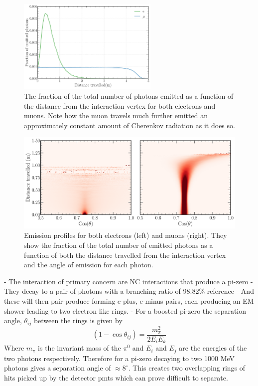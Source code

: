 \begin{figure} %
    \includegraphics[width=0.6\textwidth]{diagrams/4-chips/emission_distance.pdf}
    \caption[Fraction of Cherenkov photons emitted as a function of distance.]
    {The fraction of the total number of photons emitted as a function of the distance from the
        interaction vertex for both electrons and muons. Note how the muon travels much further
        emitted an approximately constant amount of Cherenkov radiation as it does so.}
    \label{fig:emission distance}
\end{figure}

\begin{figure} %
    \includegraphics[width=\textwidth]{diagrams/4-chips/emission_profile.pdf}
    \caption[Emission profiles for both electrons and muons]
    {Emission profiles for both electrons (left) and muons (right). They show the fraction of the
        total number of emitted photons as a function of both the distance travelled from the
        interaction vertex and the angle of emission for each photon.}
    \label{fig:emission_profile}
\end{figure}

- The interaction of primary concern are NC interactions that produce a pi-zero
- They decay to a pair of photons with a branching ratio of 98.82\% reference
- And these will then pair-produce forming e-plus, e-minus pairs, each producing an EM shower
leading to two electron like rings.
- For a boosted pi-zero the separation angle, $\theta_{ij}$ between the rings is given by
\begin{equation}
    (1-\cos\theta_{ij})=\frac{m_{\pi}^2}{2E_{i}E_{k}}
\end{equation}
Where $m_{\pi}$ is the invariant mass of the $\pi^{0}$ and $E_{i}$ and $E_{j}$ are the energies
of the two photons respectively.
Therefore for a pi-zero decaying to two 1000 MeV photons gives a separation angle of
$\approx 8^{\circ}$. This creates two overlapping rings of hits picked up by the detector pmts
which can prove difficult to separate.

